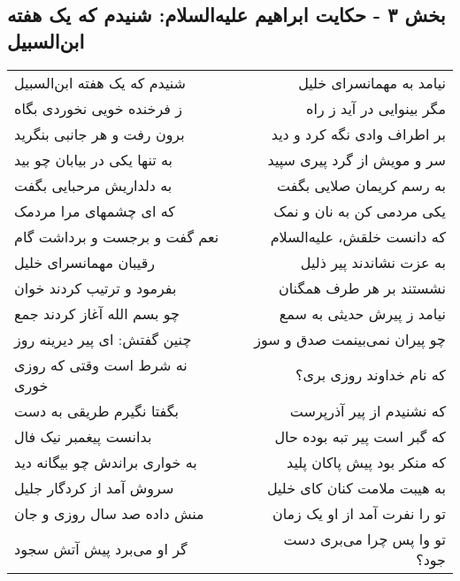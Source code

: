 \begin{center}
\section*{بخش ۳ - حکایت ابراهیم علیه‌السلام: شنیدم که یک هفته ابن‌السبیل}
\label{sec:003}
\begin{longtable}{l p{0.5cm} r}
شنیدم که یک هفته ابن‌السبیل
&&
نیامد به مهمانسرای خلیل
\\
ز فرخنده خویی نخوردی بگاه
&&
مگر بینوایی در آید ز راه
\\
برون رفت و هر جانبی بنگرید
&&
بر اطراف وادی نگه کرد و دید
\\
به تنها یکی در بیابان چو بید
&&
سر و مویش از گرد پیری سپید
\\
به دلداریش مرحبایی بگفت
&&
به رسم کریمان صلایی بگفت
\\
که ای چشمهای مرا مردمک
&&
یکی مردمی کن به نان و نمک
\\
نعم گفت و برجست و برداشت گام
&&
که دانست خلقش، علیه‌السلام
\\
رقیبان مهمانسرای خلیل
&&
به عزت نشاندند پیر ذلیل
\\
بفرمود و ترتیب کردند خوان
&&
نشستند بر هر طرف همگنان
\\
چو بسم الله آغاز کردند جمع
&&
نیامد ز پیرش حدیثی به سمع
\\
چنین گفتش: ای پیر دیرینه روز
&&
چو پیران نمی‌بینمت صدق و سوز
\\
نه شرط است وقتی که روزی خوری
&&
که نام خداوند روزی بری؟
\\
بگفتا نگیرم طریقی به دست
&&
که نشنیدم از پیر آذرپرست
\\
بدانست پیغمبر نیک فال
&&
که گبر است پیر تبه بوده حال
\\
به خواری براندش چو بیگانه دید
&&
که منکر بود پیش پاکان پلید
\\
سروش آمد از کردگار جلیل
&&
به هیبت ملامت کنان کای خلیل
\\
منش داده صد سال روزی و جان
&&
تو را نفرت آمد از او یک زمان
\\
گر او می‌برد پیش آتش سجود
&&
تو وا پس چرا می‌بری دست جود؟
\\
\end{longtable}
\end{center}
